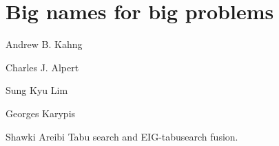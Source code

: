 \documentclass[12pt,a4paper]{article}
\theoremstyle{customdef}
\begin{document}


\section{Big names for big problems}

\begin{description}

	\item{Andrew B. Kahng}

	\item{Charles J. Alpert}

	\item{Sung Kyu Lim}

	\item{Georges Karypis}

	\item{Shawki Areibi}
	Tabu search and EIG-tabusearch fusion.
\end{description}

\newpage

\glsaddall
\printglossaries

\newpage

% 

\end{document}
